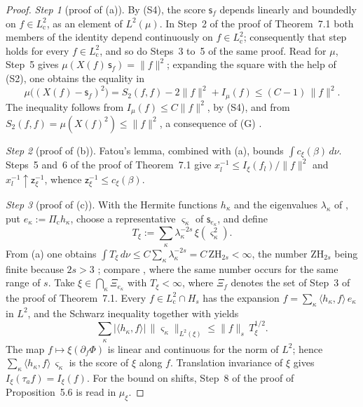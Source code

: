 \documentclass[11pt]{amsart}
\theoremstyle{definition}
\begin{document}
\begin{proof}
\emph{Step 1} (proof of (a)).
By (S4), the score $\mathsf s_f$ depends linearly and boundedly on $f\in L^2_{\mathrm c}$, as an element of $L^2(\mu)$.
In Step~2 of the proof of Theorem~7.1 both members of the identity depend continuously on $f\in L^2_{\mathrm c}$;
consequently that step holds for every $f\in L^2_{\mathrm c}$, and so do Steps~3 to~5 of the same proof.
Read for $\mu$, Step~5 gives $\mu(X(f)\,\mathsf s_f)=\|f\|^2$;
expanding the square with the help of (S2), one obtains the equality in
\begin{equation*}
\mu\bigl((X(f)-\mathsf s_f)^2\bigr)=S_2(f,f)-2\|f\|^2+I_\mu(f)\le(C-1)\,\|f\|^2.
\end{equation*}
The inequality follows from $I_\mu(f)\le C\|f\|^2$, by (S4), and from $S_2(f,f)=\mu(X(f)^2)\le\|f\|^2$, a consequence of (G) \cite[Lemma~14.3\,(a)]{QEDII}.

\emph{Step 2} (proof of (b)).
Fatou's lemma, combined with (a), bounds $\int c_\xi(\beta)\,d\nu$.
Steps~5 and~6 of the proof of Theorem~7.1 give $x_l^{-1}\le I_\xi(f_l)/\|f\|^2$ and $x_l^{-1}\uparrow\mathsf z_\xi^{-1}$, whence $\mathsf z_\xi^{-1}\le c_\xi(\beta)$.

\emph{Step 3} (proof of (c)).
With the Hermite functions $h_\kappa$ and the eigenvalues $\lambda_\kappa$ of \cite[(n8)]{QEDIII}, put $e_\kappa:=\Pi_{\mathrm c}h_\kappa$, choose a representative $\varsigma_\kappa$ of $\mathsf s_{e_\kappa}$, and define
\begin{equation*}
T_\xi:=\sum_\kappa\lambda_\kappa^{-2s}\,\xi(\varsigma_\kappa^2).
\end{equation*}
From (a) one obtains $\int T_\xi\,\allowbreak d\nu\le C\sum_\kappa\lambda_\kappa^{-2s}=\allowbreak C\,\allowbreak \mathrm{ZH}_{2s}<\infty$, the number $\mathrm{ZH}_{2s}$ being finite because $2s>3$ \cite[Section~7.1.5]{QEDI};
compare \cite[Proposition~45.1\,(3)]{QEDIII}, where the same number occurs for the same range of $s$.
Take $\xi\in\bigcap_\kappa\Xi_{e_\kappa}$ with $T_\xi<\infty$, where $\Xi_f$ denotes the set of Step~3 of the proof of Theorem~7.1.
Every $f\in L^2_{\mathrm c}\cap H_s$ has the expansion $f=\sum_\kappa\langle h_\kappa,f\rangle\,e_\kappa$ in $L^2$,
and the Schwarz inequality together with \cite[(n8)]{QEDIII} yields
\begin{equation*}
\sum_\kappa|\langle h_\kappa,f\rangle|\,\|\varsigma_\kappa\|_{L^2(\xi)}\le\|f\|_s\,T_\xi^{1/2}.
\end{equation*}
The map $f\mapsto\xi(\partial_f\Phi)$ is linear and continuous for the norm of $L^2$;
hence $\sum_\kappa\langle h_\kappa,f\rangle\,\varsigma_\kappa$ is the score of $\xi$ along $f$.
Translation invariance of $\xi$ gives $I_\xi(\tau_af)=I_\xi(f)$.
For the bound on shifts, Step~8 of the proof of Proposition~5.6 is read in $\mu_\xi$.


\end{proof}
\end{document}
